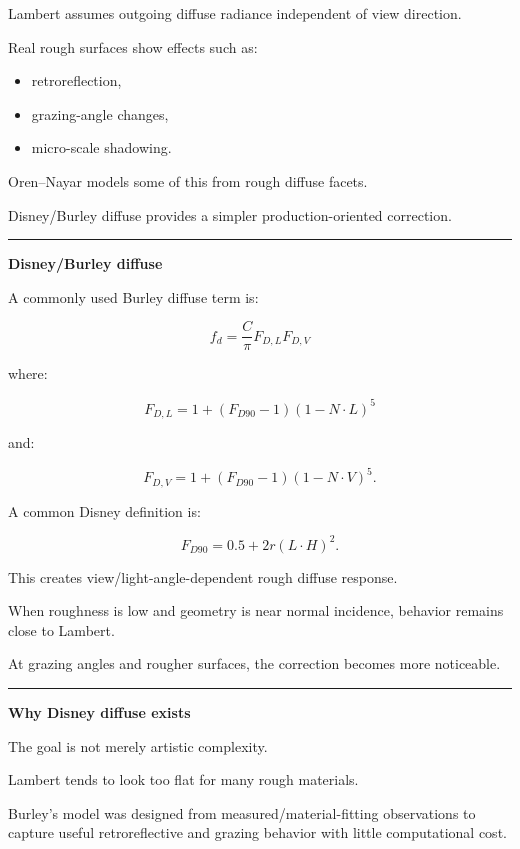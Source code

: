 Lambert assumes outgoing diffuse radiance independent of view direction.

Real rough surfaces show effects such as:

\begin{itemize}
\tightlist
\item
  retroreflection,
\item
  grazing-angle changes,
\item
  micro-scale shadowing.
\end{itemize}

Oren--Nayar models some of this from rough diffuse facets.

Disney/Burley diffuse provides a simpler production-oriented correction.

\begin{center}\rule{0.5\linewidth}{0.5pt}\end{center}

\textbf{Disney/Burley diffuse}

A commonly used Burley diffuse term is:

\[
\boxed{
f_d=
\frac{C}{\pi}
F_{D,L}
F_{D,V}
}
\]

where:

\[
F_{D,L}
=
1+
(F_{D90}-1)(1-N\cdot L)^5
\]

and:

\[
F_{D,V}
=
1+
(F_{D90}-1)(1-N\cdot V)^5.
\]

A common Disney definition is:

\[
\boxed{
F_{D90}
=
0.5+
2r(L\cdot H)^2.
}
\]

This creates view/light-angle-dependent rough diffuse response.

When roughness is low and geometry is near normal incidence, behavior remains close to Lambert.

At grazing angles and rougher surfaces, the correction becomes more noticeable.

\begin{center}\rule{0.5\linewidth}{0.5pt}\end{center}

\textbf{Why Disney diffuse exists}

The goal is not merely artistic complexity.

Lambert tends to look too flat for many rough materials.

Burley's model was designed from measured/material-fitting observations to capture useful retroreflective and grazing behavior with little computational cost.

